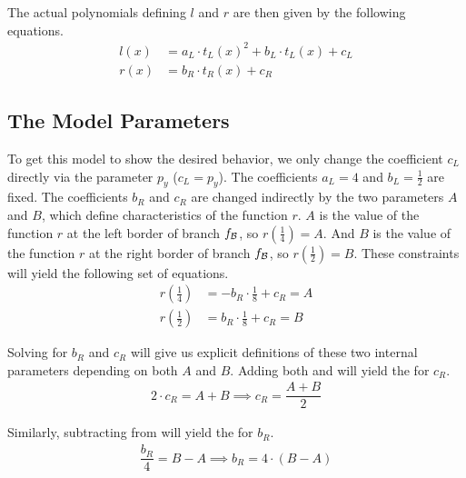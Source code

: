 The actual polynomials defining $l$ and $r$ are then given by the following equations.
\begin{align}
    l(x) & = a_L \cdot t_L(x)^2 + b_L \cdot t_L(x) + c_L \\
    r(x) & = b_R \cdot t_R(x) + c_R
    \label{equ:final.def.r}
\end{align}

\subsection{The Model Parameters}

To get this model to show the desired behavior, we only change the coefficient $c_L$ directly via the parameter $p_y$ ($c_L = p_y$).
The coefficients $a_L = 4$ and $b_L = \frac{1}{2}$ are fixed.
The coefficients $b_R$ and $c_R$ are changed indirectly by the two parameters $A$ and $B$, which define characteristics of the function $r$.
$A$ is the value of the function $r$ at the left border of branch $f_{\mathcal{B}}$, so $r(\frac{1}{4}) = A$.
And $B$ is the value of the function $r$ at the right border of branch $f_{\mathcal{B}}$, so $r(\frac{1}{2}) = B$.
These constraints will yield the following set of equations.
\begin{subequations}
    \begin{align}
        r\left(\frac{1}{4}\right) & = - b_R \cdot \frac{1}{8} + c_R = A
        \label{equ:final.def.param.constr.A}
        \\
        r\left(\frac{1}{2}\right) & = b_R \cdot \frac{1}{8} + c_R = B
        \label{equ:final.def.param.constr.B}
    \end{align}
\end{subequations}

Solving for $b_R$ and $c_R$ will give us explicit definitions of these two internal parameters depending on both $A$ and $B$.
Adding both  and  will yield the  for $c_R$.
\begin{align}
    2 \cdot c_R = A + B \implies c_R = \dfrac{A + B}{2}
    \label{equ:final.def.param.cR}
\end{align}

Similarly, subtracting  from  will yield the  for $b_R$.
\begin{align}
    \dfrac{b_R}{4} = B - A \implies b_R = 4 \cdot (B - A)
    \label{equ:final.def.param.bR}
\end{align}

